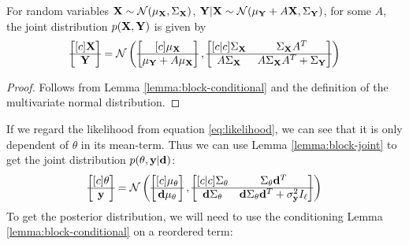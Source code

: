 \begin{lemma}
  \label{lemma:block-joint}
  For random variables $\mathbf{X} \sim \mathcal{N}(\mathbf{\mu}_{\mathbf{X}}, \Sigma_{\mathbf{X}})$, $\mathbf{Y}|\mathbf{X} \sim \mathcal{N}(\mathbf{\mu}_{\mathbf{Y}} + A\mathbf{X}, \Sigma_{\mathbf{Y}})$,
  for some $A$, the joint distribution $p(\mathbf{X}, \mathbf{Y})$ is given by
  \begin{equation}
    \begin{bmatrix}[c]
      \mathbf{X} \\
      \hline
      \mathbf{Y}
    \end{bmatrix}
    =
    \mathcal{N}\left(
      \begin{bmatrix}[c]
        \mathbf{\mu}_{\mathbf{X}} \\
        \hline
        \mathbf{\mu}_{\mathbf{Y}} + A\mathbf{\mu}_{\mathbf{X}}
      \end{bmatrix},
      \begin{bmatrix}[c | c]
        \Sigma_{\mathbf{X}} & \Sigma_{\mathbf{X}}A^T \\
        \hline
        A\Sigma_{\mathbf{X}} & A\Sigma_{\mathbf{X}}A^T + \Sigma_{\mathbf{Y}}
      \end{bmatrix}
    \right)
  \end{equation}
\end{lemma}
\begin{proof}
  Follows from Lemma \ref{lemma:block-conditional} and the definition of the multivariate normal distribution.
\end{proof}
If we regard the likelihood from equation \ref{eq:likelihood}, we can see that it is only dependent of $\theta$ in its mean-term.
Thus we can use Lemma \ref{lemma:block-joint} to get the joint distribution $p(\theta, \mathbf{y} | \mathbf{d})$:
\begin{equation}
  \begin{bmatrix}[c]
    \theta \\
    \hline
    \mathbf{y}
  \end{bmatrix}
  =
  \mathcal{N}\left(
    \begin{bmatrix}[c]
      \mu_\theta \\
      \hline
      \mathbf{d}\mu_\theta
    \end{bmatrix},
    \begin{bmatrix}[c | c]
      \Sigma_{\mathbf{\theta}} & \Sigma_{\mathbf{\theta}}\mathbf{d}^T \\
      \hline
      \mathbf{d}\Sigma_{\mathbf{\theta}} & \mathbf{d}\Sigma_{\mathbf{\theta}}\mathbf{d}^T + \sigma^2_{\mathbf{y}} I_\ell
    \end{bmatrix}
  \right)
\end{equation}
To get the posterior distribution, we will need to use the conditioning Lemma \ref{lemma:block-conditional} on a reordered term:
